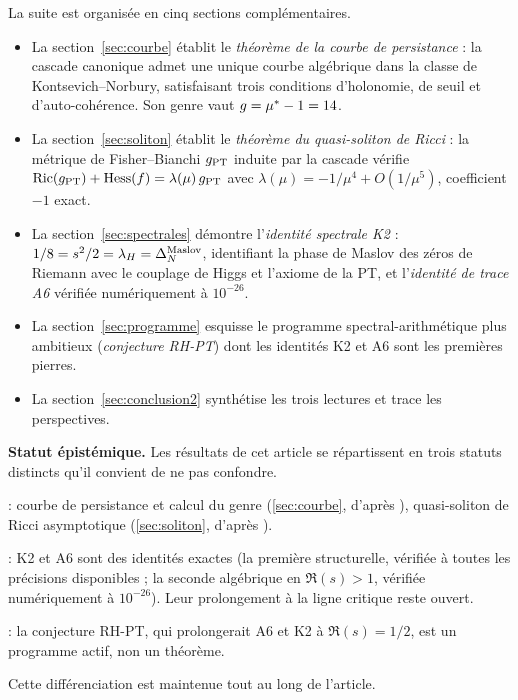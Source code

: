 La suite est organisée en cinq sections complémentaires.
\begin{itemize}[nosep,leftmargin=*]
\item La section~\ref{sec:courbe} établit le \emph{théorème de la courbe de persistance} : la cascade canonique admet une unique courbe algébrique dans la classe de Kontsevich--Norbury, satisfaisant trois conditions d'holonomie, de seuil et d'auto-cohérence. Son genre vaut $g = \mu^{*} - 1 = 14$.
\item La section~\ref{sec:soliton} établit le \emph{théorème du quasi-soliton de Ricci} : la métrique de Fisher--Bianchi $g_{\rm PT}$ induite par la cascade vérifie $\mathrm{Ric}(g_{\rm PT}) + \mathrm{Hess}(f) = \lambda(\mu)\, g_{\rm PT}$ avec $\lambda(\mu) = -1/\mu^{4} + O(1/\mu^{5})$, coefficient $-1$ exact.
\item La section~\ref{sec:spectrales} démontre l'\emph{identité spectrale K2} : $1/8 = s^{2}/2 = \lambda_H = \Delta_N^{\rm Maslov}$, identifiant la phase de Maslov des zéros de Riemann avec le couplage de Higgs et l'axiome de la PT, et l'\emph{identité de trace A6} vérifiée numériquement à $10^{-26}$.
\item La section~\ref{sec:programme} esquisse le programme spectral-arithmétique plus ambitieux (\emph{conjecture RH-PT}) dont les identités K2 et A6 sont les premières pierres.
\item La section~\ref{sec:conclusion2} synthétise les trois lectures et trace les perspectives.
\end{itemize}

\textbf{Statut épistémique.} Les résultats de cet article se répartissent en trois statuts distincts qu'il convient de ne pas confondre.
\begin{description}[nosep,leftmargin=*]
\item[Théorèmes prouvés inconditionnellement] : courbe de persistance et calcul du genre (\ref{sec:courbe}, d'après \cite{PT_GeoFlow_PersistenceCurve}), quasi-soliton de Ricci asymptotique (\ref{sec:soliton}, d'après \cite{PT_GeoFlow_RicciSoliton}).
\item[Identités prouvées] : K2 et A6 sont des identités exactes (la première structurelle, vérifiée à toutes les précisions disponibles ; la seconde algébrique en $\Re(s) > 1$, vérifiée numériquement à $10^{-26}$). Leur prolongement à la ligne critique reste ouvert.
\item[Programme conjectural] : la conjecture RH-PT, qui prolongerait A6 et K2 à $\Re(s) = 1/2$, est un programme actif, non un théorème.
\end{description}
Cette différenciation est maintenue tout au long de l'article.
